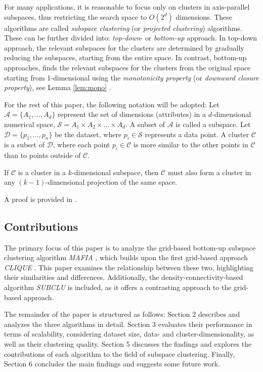 For many applications, it is reasonable to focus only on clusters in axis-parallel subspaces, thus restricting the search space to $O(2^d)$ dimensions. These algorithms are called \textit{subspace clustering} (or \textit{projected clustering}) algorithms. These can be further divided into: \textit{top-down}- or \textit{bottom-up} approach. In top-down approach, the relevant subspaces for the clusters are determined by gradually reducing the subspaces, starting from the entire space. In contrast, bottom-up approaches, finds the relevant subspaces for the clusters from the original space starting from 1-dimensional using the \textit{monotonicity property} (or \textit{downward closure property}), see Lemma \ref{lem:mono} \cite{clique}. \cite[p.~8,~11]{kriegel-2009}

For the rest of this paper, the following notation will be adopted: Let $\mathcal{A} = \{A_1, \dots, A_d\}$ represent the set of dimensions (attributes) in a $d$-dimensional numerical space, $\mathcal{S} = A_1 \times A_2 \times \dots \times A_d$. A subset of $\mathcal{A}$ is called a subspace. Let $\mathcal{D} = \{p_1, \dots, p_n\}$ be the dataset, where $p_i \in \mathcal{S}$ represents a data point. A cluster $\mathcal{C}$ is a subset of $\mathcal{D}$, where each point $p_i \in \mathcal{C}$ is more similar to the other points in $\mathcal{C}$ than to points outside of $\mathcal{C}$.

\begin{lemma}\label{lem:mono}
    If $\mathcal{C}$ is a cluster in a $k$-dimensional subspace, then $\mathcal{C}$ must also form a cluster in any $(k-1)$-dimensional projection of the same space.
\end{lemma}
A proof is provided in \cite{clique}.

\subsection{Contributions}
The primary focus of this paper is to analyze the grid-based bottom-up subspace clustering algorithm \textit{MAFIA} \cite{mafia}, which builds upon the first grid-based approach \textit{CLIQUE} \cite{clique}. This paper examines the relationship between these two, highlighting their similarities and differences. Additionally, the density-connectivity-based algorithm \textit{SUBCLU} \cite{subclu} is included, as it offers a contrasting approach to the grid-based approach.

The remainder of the paper is structured as follows: Section 2 describes and analyzes the three algorithms in detail. Section 3 evaluates their performance in terms of scalability, considering dataset size, data- and cluster-dimensionality, as well as their clustering quality. Section 5 discusses the findings and explores the contributions of each algorithm to the field of subspace clustering. Finally, Section 6 concludes the main findings and suggests some future work.